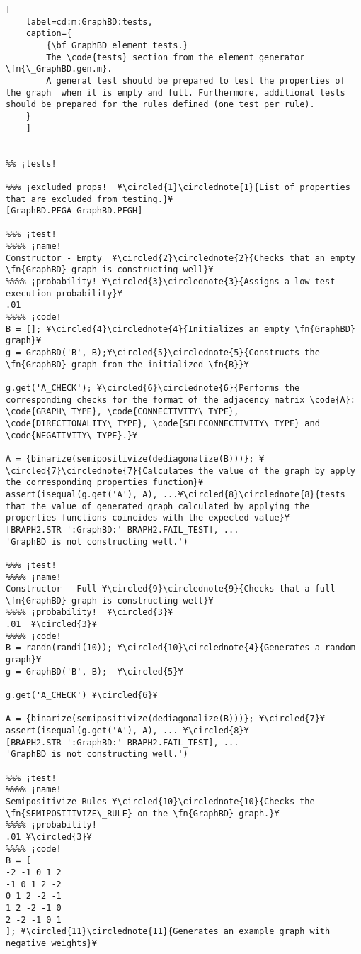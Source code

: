 \documentclass{tufte-handout}
\begin{document}
\begin{lstlisting}[
	label=cd:m:GraphBD:tests,
	caption={
		{\bf GraphBD element tests.}
		The \code{tests} section from the element generator \fn{\_GraphBD.gen.m}.
		A general test should be prepared to test the properties of the graph  when it is empty and full. Furthermore, additional tests should be prepared for the rules defined (one test per rule).
	}
	]		
		

%% ¡tests!

%%% ¡excluded_props!  ¥\circled{1}\circlednote{1}{List of properties that are excluded from testing.}¥
[GraphBD.PFGA GraphBD.PFGH]

%%% ¡test!
%%%% ¡name!
Constructor - Empty  ¥\circled{2}\circlednote{2}{Checks that an empty \fn{GraphBD} graph is constructing well}¥
%%%% ¡probability! ¥\circled{3}\circlednote{3}{Assigns a low test execution probability}¥
.01
%%%% ¡code!
B = []; ¥\circled{4}\circlednote{4}{Initializes an empty \fn{GraphBD} graph}¥
g = GraphBD('B', B);¥\circled{5}\circlednote{5}{Constructs the \fn{GraphBD} graph from the initialized \fn{B}}¥

g.get('A_CHECK'); ¥\circled{6}\circlednote{6}{Performs the corresponding checks for the format of the adjacency matrix \code{A}: \code{GRAPH\_TYPE}, \code{CONNECTIVITY\_TYPE}, \code{DIRECTIONALITY\_TYPE}, \code{SELFCONNECTIVITY\_TYPE} and \code{NEGATIVITY\_TYPE}.}¥

A = {binarize(semipositivize(dediagonalize(B)))}; ¥\circled{7}\circlednote{7}{Calculates the value of the graph by apply the corresponding properties function}¥
assert(isequal(g.get('A'), A), ...¥\circled{8}\circlednote{8}{tests that the value of generated graph calculated by applying the properties functions coincides with the expected value}¥
[BRAPH2.STR ':GraphBD:' BRAPH2.FAIL_TEST], ...
'GraphBD is not constructing well.')

%%% ¡test!
%%%% ¡name!
Constructor - Full ¥\circled{9}\circlednote{9}{Checks that a full \fn{GraphBD} graph is constructing well}¥
%%%% ¡probability!  ¥\circled{3}¥
.01  ¥\circled{3}¥
%%%% ¡code!
B = randn(randi(10)); ¥\circled{10}\circlednote{4}{Generates a random graph}¥
g = GraphBD('B', B);  ¥\circled{5}¥

g.get('A_CHECK') ¥\circled{6}¥

A = {binarize(semipositivize(dediagonalize(B)))}; ¥\circled{7}¥
assert(isequal(g.get('A'), A), ... ¥\circled{8}¥
[BRAPH2.STR ':GraphBD:' BRAPH2.FAIL_TEST], ...
'GraphBD is not constructing well.')

%%% ¡test!
%%%% ¡name!
Semipositivize Rules ¥\circled{10}\circlednote{10}{Checks the \fn{SEMIPOSITIVIZE\_RULE} on the \fn{GraphBD} graph.}¥
%%%% ¡probability!
.01 ¥\circled{3}¥
%%%% ¡code!
B = [
-2 -1 0 1 2
-1 0 1 2 -2
0 1 2 -2 -1
1 2 -2 -1 0
2 -2 -1 0 1
]; ¥\circled{11}\circlednote{11}{Generates an example graph with negative weights}¥


\end{lstlisting}
\end{document}
